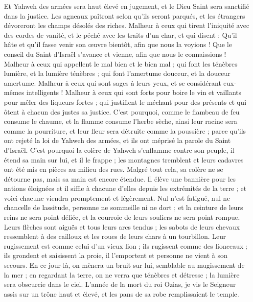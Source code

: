 \begin{multicols}{2}
Et Yahweh des armées sera haut élevé en jugement, et le Dieu Saint sera sanctifié dans la justice.
Les agneaux paîtront selon qu'ils seront parqués, et les étrangers dévoreront les champs désolés des riches.
Malheur à ceux qui tirent l'iniquité avec des cordes de vanité, et le péché avec les traits d'un char,
et qui disent : Qu'il hâte et qu'il fasse venir son œuvre bientôt, afin que nous la voyions ! Que le conseil du Saint d'Israël s'avance et vienne, afin que nous le connaissions !
Malheur à ceux qui appellent le mal bien et le bien mal ; qui font les ténèbres lumière, et la lumière ténèbres ; qui font l'amertume douceur, et la douceur amertume.
Malheur à ceux qui sont sages à leurs yeux, et se considérant eux-mêmes intelligents !
Malheur à ceux qui sont forts pour boire le vin et vaillants pour mêler des liqueurs fortes ;
qui justifient le méchant pour des présents et qui ôtent à chacun des justes sa justice.
C'est pourquoi, comme le flambeau de feu consume le chaume, et la flamme consume l'herbe sèche, ainsi leur racine sera comme la pourriture, et leur fleur sera détruite comme la poussière ; parce qu'ils ont rejeté la loi de Yahweh des armées, et ils ont méprisé la parole du Saint d'Israël.
C'est pourquoi la colère de Yahweh s'enflamme contre son peuple, il étend sa main sur lui, et il le frappe ; les montagnes tremblent et leurs cadavres ont été mis en pièces au milieu des rues. Malgré tout cela, sa colère ne se détourne pas, mais sa main est encore étendue.
Il élève une bannière pour les nations éloignées et il siffle à chacune d'elles depuis les extrémités de la terre ; et voici chacune viendra promptement et légèrement.
Nul n'est fatigué, nul ne chancelle de lassitude, personne ne sommeille ni ne dort ; et la ceinture de leurs reins ne sera point déliée, et la courroie de leurs souliers ne sera point rompue.
Leurs flèches sont aiguës et tous leurs arcs tendus ; les sabots de leurs chevaux ressemblent à des cailloux et les roues de leurs chars à un tourbillon.
Leur rugissement est comme celui d'un vieux lion ; ils rugissent comme des lionceaux ; ils grondent et saisissent la proie, il l'emportent et personne ne vient à son secours.
En ce jour-là, on mènera un bruit sur lui, semblable au mugissement de la mer ; en regardant la terre, on ne verra que ténèbres et détresse ; la lumière sera obscurcie dans le ciel.
\VerseOne{}L'année de la mort du roi Ozias, je vis le Seigneur assis sur un trône haut et élevé, et les pans de sa robe remplissaient le temple.

\end{multicols}

